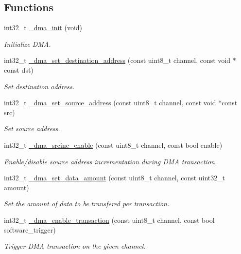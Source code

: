 \subsection*{Functions}
\begin{DoxyCompactItemize}
\item 
int32\+\_\+t \hyperlink{group___h_p_l_ga80907744cae62409ce0764e1d2ade4a6}{\+\_\+dma\+\_\+init} (void)
\begin{DoxyCompactList}\small\item\em Initialize D\+MA. \end{DoxyCompactList}\item 
int32\+\_\+t \hyperlink{group___h_p_l_ga2a40fb892a927cef99863e1f4ca71f85}{\+\_\+dma\+\_\+set\+\_\+destination\+\_\+address} (const uint8\+\_\+t channel, const void $\ast$const dst)
\begin{DoxyCompactList}\small\item\em Set destination address. \end{DoxyCompactList}\item 
int32\+\_\+t \hyperlink{group___h_p_l_gae86b412fa86727c686496e63dac65a52}{\+\_\+dma\+\_\+set\+\_\+source\+\_\+address} (const uint8\+\_\+t channel, const void $\ast$const src)
\begin{DoxyCompactList}\small\item\em Set source address. \end{DoxyCompactList}\item 
int32\+\_\+t \hyperlink{group___h_p_l_ga72844b40ebb8b4d69ec49a218389a9e3}{\+\_\+dma\+\_\+srcinc\+\_\+enable} (const uint8\+\_\+t channel, const bool enable)
\begin{DoxyCompactList}\small\item\em Enable/disable source address incrementation during D\+MA transaction. \end{DoxyCompactList}\item 
int32\+\_\+t \hyperlink{group___h_p_l_gac6ccb282c608691f7cb8ec2350677fbf}{\+\_\+dma\+\_\+set\+\_\+data\+\_\+amount} (const uint8\+\_\+t channel, const uint32\+\_\+t amount)
\begin{DoxyCompactList}\small\item\em Set the amount of data to be transfered per transaction. \end{DoxyCompactList}\item 
int32\+\_\+t \hyperlink{group___h_p_l_ga274dfd4667fa2dedb9d550b4f92189d8}{\+\_\+dma\+\_\+enable\+\_\+transaction} (const uint8\+\_\+t channel, const bool software\+\_\+trigger)
\begin{DoxyCompactList}\small\item\em Trigger D\+MA transaction on the given channel. \end{DoxyCompactList}\item 

\end{DoxyCompactItemize}
